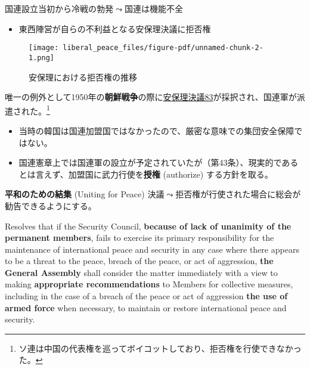 \documentclass[
  xelatex,
  ja=standard]{bxjsarticle}
\providecommand{\tightlist}{%
  \setlength{\itemsep}{0pt}\setlength{\parskip}{0pt}}\usepackage{longtable,booktabs,array}
\begin{document}
国連設立当初から冷戦の勃発\(\leadsto\)国連は機能不全

\begin{itemize}
\tightlist
\item
  東西陣営が自らの不利益となる安保理決議に拒否権
\end{itemize}

\begin{figure}[htpb]

{\centering \texttt{[image: liberal\_peace\_files/figure-pdf/unnamed-chunk-2-1.png]}

}

\caption{安保理における拒否権の推移}

\end{figure}

唯一の例外として1950年の\textbf{朝鮮戦争}の際に\href{https://ja.wikisource.org/wiki/\%E5\%9B\%BD\%E9\%9A\%9B\%E9\%80\%A3\%E5\%90\%88\%E5\%AE\%89\%E5\%85\%A8\%E4\%BF\%9D\%E9\%9A\%9C\%E7\%90\%86\%E4\%BA\%8B\%E4\%BC\%9A\%E6\%B1\%BA\%E8\%AD\%B083}{安保理決議83}が採択され、国連軍が派遣された。\footnote{ソ連は中国の代表権を巡ってボイコットしており、拒否権を行使できなかった。}

\begin{itemize}
\tightlist
\item
  当時の韓国は国連加盟国ではなかったので、厳密な意味での集団安全保障ではない。
\item
  国連憲章上では国連軍の設立が予定されていたが（第43条）、現実的であるとは言えず、加盟国に武力行使を\textbf{授権}
  (authorize) する方針を取る。
\end{itemize}

\textbf{平和のための結集} (Uniting for Peace)
決議\(\leadsto\)拒否権が行使された場合に総会が勧告できるようにする。

\begin{tcolorbox}[enhanced jigsaw, rightrule=.15mm, breakable, bottomrule=.15mm, colback=white, left=2mm, toptitle=1mm, title=\textcolor{quarto-callout-note-color}{\faInfo}\hspace{0.5em}{平和のための結集決議　主文1}, colbacktitle=quarto-callout-note-color!10!white, titlerule=0mm, coltitle=black, bottomtitle=1mm, arc=.35mm, opacitybacktitle=0.6, leftrule=.75mm, colframe=quarto-callout-note-color-frame, toprule=.15mm, opacityback=0]

Resolves that if the Security Council, \textbf{because of lack of
unanimity of the permanent members}, fails to exercise its primary
responsibility for the maintenance of international peace and security
in any case where there appears to be a threat to the peace, breach of
the peace, or act of aggression, \textbf{the General Assembly} shall
consider the matter immediately with a view to making
\textbf{appropriate recommendations} to Members for collective measures,
including in the case of a breach of the peace or act of aggression
\textbf{the use of armed force} when necessary, to maintain or restore
international peace and security.

\end{tcolorbox}
\end{document}

